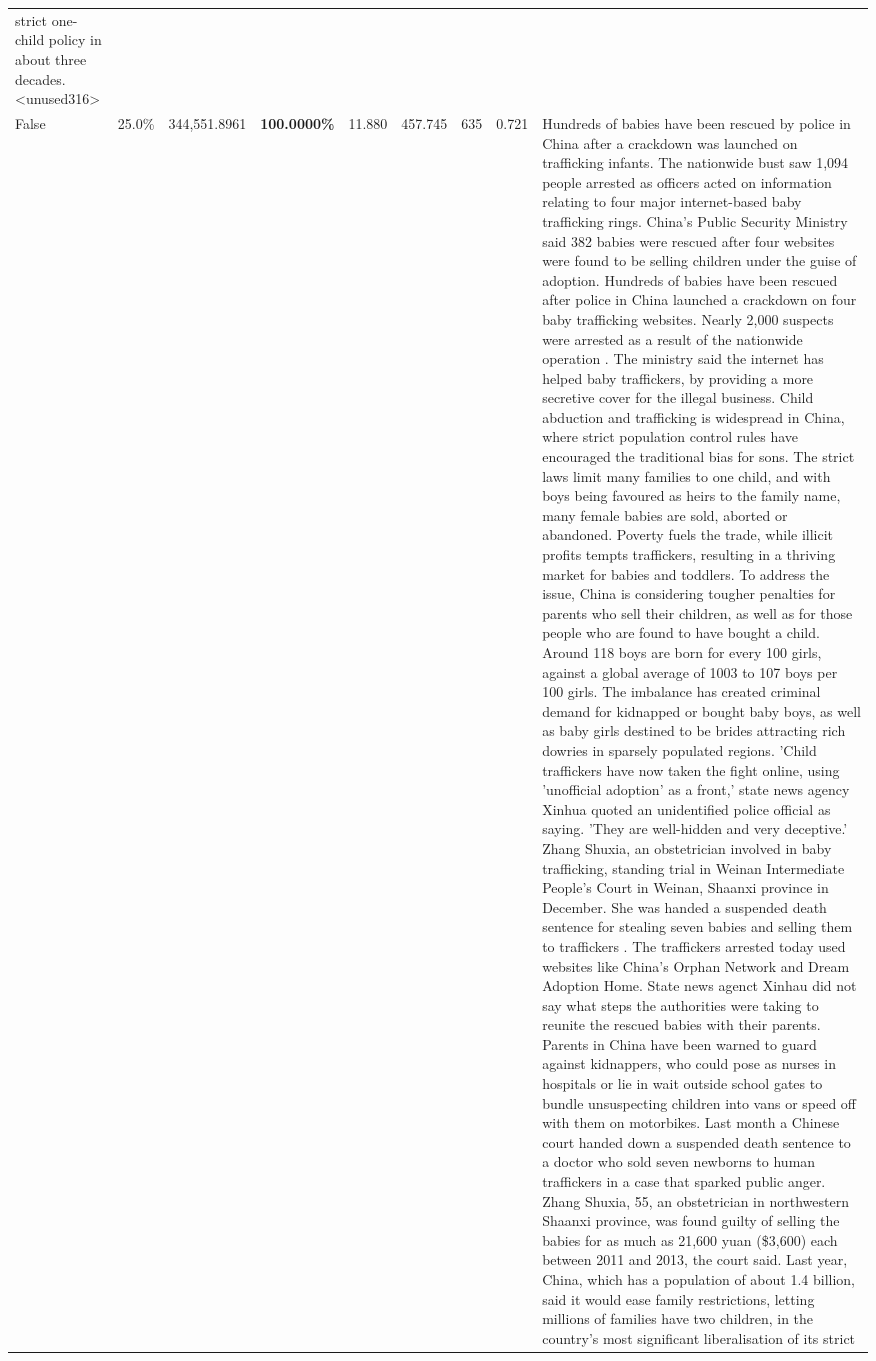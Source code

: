 \begin{table}[H]
\begin{tabular}{lllrlllll}
strict one-child policy in about three decades.<unused316> \\
\cline{1-9}
False & 25.0\% & 344,551.8961 & \bfseries \color{red} 100.0000\% & 11.880 & 457.745 & 635 & 0.721 & Hundreds of babies have been rescued by police in China after a crackdown was launched on trafficking infants. The nationwide bust saw 1,094 people arrested as officers acted on information relating to four major internet-based baby trafficking rings. China's Public Security Ministry said 382 babies were rescued after four websites were found to be selling children under the guise of adoption. Hundreds of babies have been rescued after police in China launched a crackdown on four baby trafficking websites. Nearly 2,000 suspects were arrested as a result of the nationwide operation . The ministry said the internet has helped baby traffickers, by providing a more secretive cover for the illegal business. Child abduction and trafficking is widespread in China, where strict population control rules have encouraged the traditional bias for sons. The strict laws limit many families to one child, and with boys being favoured as heirs to the family name, many female babies are sold, aborted or abandoned. Poverty fuels the trade, while illicit profits tempts traffickers, resulting in a thriving market for babies and toddlers. To address the issue, China is considering tougher penalties for parents who sell their children, as well as for those people who are found to have bought a child. Around 118 boys are born for every 100 girls, against a global average of 1003 to 107 boys per 100 girls. The imbalance has created criminal demand for kidnapped or bought baby boys, as well as baby girls destined to be brides attracting rich dowries in sparsely populated regions. 'Child traffickers have now taken the fight online, using 'unofficial adoption' as a front,' state news agency Xinhua quoted an unidentified police official as saying. 'They are well-hidden and very deceptive.' Zhang Shuxia, an obstetrician involved in baby trafficking, standing trial in Weinan Intermediate People's Court in Weinan, Shaanxi province in December. She was handed a suspended death sentence for stealing seven babies and selling them to traffickers . The traffickers arrested today used websites like China's Orphan Network and Dream Adoption Home. State news agenct Xinhau did not say what steps the authorities were taking to reunite the rescued babies with their parents. Parents in China have been warned to guard against kidnappers, who could pose as nurses in hospitals or lie in wait outside school gates to bundle unsuspecting children into vans or speed off with them on motorbikes. Last month a Chinese court handed down a suspended death sentence to a doctor who sold seven newborns to human traffickers in a case that sparked public anger. Zhang Shuxia, 55, an obstetrician in northwestern Shaanxi province, was found guilty of selling the babies for as much as 21,600 yuan (\$3,600) each between 2011 and 2013, the court said. Last year, China, which has a population of about 1.4 billion, said it would ease family restrictions, letting millions of families have two children, in the country's most significant liberalisation of its strict 
\end{tabular}
\end{table}
